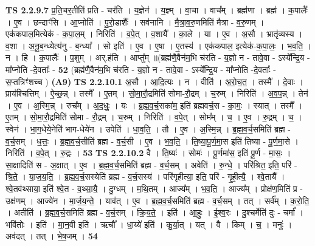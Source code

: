 \documentclass[17pt]{extarticle}
\begin{document}
                  \newline
                                \textbf{ TS 2.2.9.7} \newline
                  प्र॒ति॒चर॒तीति॑ प्रति - चर॑ति । य॒ज्ञेन॑ । य॒ज्ञ्म् । वा॒चा । वाच᳚म् । ब्रह्म॑णा । ब्रह्म॑ । क॒पालैः᳚ । ए॒व । छन्दाꣳ॑सि । आ॒प्नोति॑ । पु॒रो॒डाशैः᳚ । सव॑नानि । मै॒त्रा॒व॒रु॒णमिति॑ मैत्रा - व॒रु॒णम् । एक॑कपाल॒मित्येक॑ - क॒पा॒ल॒म् । निरिति॑ । व॒पे॒त् । व॒शायै᳚ । का॒ले । या । ए॒व । अ॒सौ । भ्रातृ॑व्यस्य । व॒शा । अ॒नू॒ब॒न्ध्येत्य॑नु - ब॒न्ध्या᳚ । सो इति॑ । ए॒व । ए॒षा । ए॒तस्य॑ । एक॑कपाल॒ इत्येक॑-क॒पा॒लः॒ । भ॒व॒ति॒ । न । हि । क॒पालैः᳚ । प॒शुम् । अर्.ह॑ति । आप्तु᳚म् ॥(ब्रह्म॑णै॒वैन॑म॒भि च॑रति - य॒ज्ञो न - तावे॒वा - ऽस्ये᳚न्द्रि॒य - मा᳚प्नोति -दे॒वताः᳚ - \textbf{  52} \newline
                  \newline
                      (ब्रह्म॑णै॒वैन॑म॒भि च॑रति - य॒ज्ञो न - तावे॒वा - ऽस्ये᳚न्द्रि॒य - मा᳚प्नोति -दे॒वताः᳚ - स॒प्तत्रिꣳ॑शच्च )  \textbf{(A9)} \newline \newline
                                \textbf{ TS 2.2.10.1} \newline
                  अ॒सौ । आ॒दि॒त्यः । न । वीति॑ । अ॒रो॒च॒त॒ । तस्मै᳚ । दे॒वाः । प्राय॑श्चित्तिम् । ऐ॒च्छ॒न्न् । तस्मै᳚ । ए॒तम् । सो॒मा॒रौ॒द्रमिति॑ सोमा-रौ॒द्रम् । च॒रुम् । निरिति॑ । अ॒व॒प॒न्न् । तेन॑ । ए॒व । अ॒स्मि॒न्न् । रुच᳚म् । अ॒द॒धुः॒ । यः । ब्र॒ह्म॒व॒र्च॒सका॑म॒ इति॑ ब्रह्मवर्च॒स - का॒मः॒ । स्यात् । तस्मै᳚ । ए॒तम् । सो॒मा॒रौ॒द्रमिति॑ सोमा - रौ॒द्रम् । च॒रुम् । निरिति॑ । व॒पे॒त् । सोम᳚म् । च॒ । ए॒व । रु॒द्रम् । च॒ । स्वेन॑ । भा॒ग॒धेये॒नेति॑ भाग-धेये॑न । उपेति॑ । धा॒व॒ति॒ । तौ । ए॒व । अ॒स्मि॒न्न् । ब्र॒ह्म॒व॒र्च॒समिति॑ ब्रह्म - व॒र्च॒सम् । ध॒त्तः॒ । ब्र॒ह्म॒व॒र्च॒सीति॑ ब्रह्म - व॒र्च॒सी । ए॒व । भ॒व॒ति॒ । ति॒ष्या॒पू॒र्ण॒मा॒स इति॑ तिष्या - पू॒र्ण॒मा॒से । निरिति॑ । व॒पे॒त् । रु॒द्रः । \textbf{  53} \newline
                  \newline
                                \textbf{ TS 2.2.10.2} \newline
                  वै । ति॒ष्यः॑ । सोमः॑ । पू॒र्णमा॑स॒ इति॑ पू॒र्ण - मा॒सः॒ । सा॒क्षादिति॑ स - अ॒क्षात् । ए॒व । ब्र॒ह्म॒व॒र्च॒समिति॑ ब्रह्म - व॒र्च॒सम् । अवेति॑ । रु॒न्धे॒ । परि॑श्रित॒ इति॒ परि॑ - श्रि॒ते॒ । या॒ज॒य॒ति॒ । ब्र॒ह्म॒व॒र्च॒सस्येति॑ ब्रह्म - व॒र्च॒सस्य॑ । परि॑गृहीत्या॒ इति॒ परि॑ - गृ॒ही॒त्यै॒ । श्वे॒तायै᳚ । श्वे॒तव॑थ्साया॒ इति॑ श्वे॒त - व॒थ्सा॒यै॒ । दु॒ग्धम् । म॒थि॒तम् । आज्य᳚म् । भ॒व॒ति॒ । आज्य᳚म् । प्रोक्ष॑ण॒मिति॑ प्र - उक्ष॑णम् । आज्ये॑न । मा॒र्ज॒य॒न्ते॒ । याव॑त् । ए॒व । ब्र॒ह्म॒व॒र्च॒समिति॑ ब्रह्म - व॒र्च॒सम् । तत् । सर्व᳚म् । क॒रो॒ति॒ । अतीति॑ । ब्र॒ह्म॒व॒र्च॒समिति॑ ब्रह्म - व॒र्च॒सम् । क्रि॒य॒ते॒ । इति॑ । आ॒हुः॒ । ई॒श्व॒रः । दु॒श्चर्मेति॑ दुः - चर्मा᳚ । भवि॑तोः । इति॑ । मा॒न॒वी इति॑ । ऋचौ᳚ । धा॒य्ये॑ इति॑ । कु॒र्या॒त् । यत् । वै । किम् । च॒ । मनुः॑ । अव॑दत् । तत् । भे॒ष॒जम् । \textbf{  54} \newline
\end{document}
